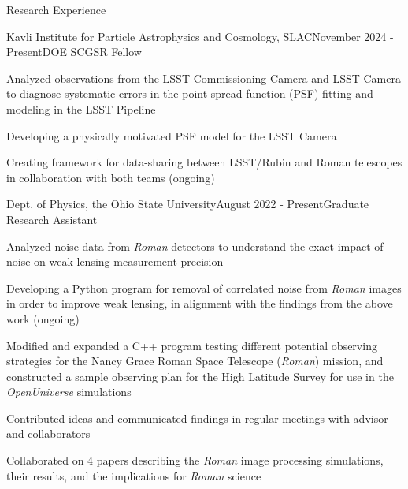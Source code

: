 \documentclass{resume} %
\begin{document}
\begin{rSection}{Research Experience} 

\begin{rSubsection}{Kavli Institute for Particle Astrophysics and Cosmology, SLAC}{November 2024 - Present}{DOE SCGSR Fellow}{}
\item Analyzed observations from the LSST Commissioning Camera and LSST Camera to diagnose systematic errors in the point-spread function (PSF) fitting and modeling in the LSST Pipeline
\item Developing a physically motivated PSF model for the LSST Camera
\item Creating framework for data-sharing between LSST/Rubin and Roman telescopes in collaboration with both teams (ongoing)
\end{rSubsection}

\begin{rSubsection}{Dept. of Physics, the Ohio State University}{August 2022 - Present}{Graduate Research Assistant}{}
\item Analyzed noise data from \textit{Roman} detectors to understand the exact impact of noise on weak lensing measurement precision
\item Developing a Python program for removal of correlated noise from \textit{Roman} images in order to improve weak lensing, in alignment with the findings from the above work (ongoing)
\item Modified and expanded a C++ program testing different potential observing strategies for the Nancy Grace Roman Space Telescope (\textit{Roman}) mission, and constructed a sample observing plan for the High Latitude Survey for use in the \textit{OpenUniverse} simulations
\item Contributed ideas and communicated findings in regular meetings with advisor and collaborators
\item Collaborated on 4 papers describing the \textit{Roman} image processing simulations, their results, and the implications for \textit{Roman} science
\end{rSubsection}



\end{rSection}
\end{document}
